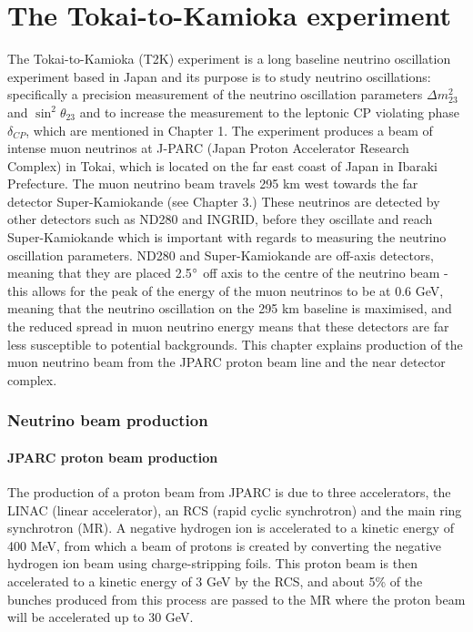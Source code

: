 \chapter{The Tokai-to-Kamioka experiment}
\label{chp:t2kdetector}

The Tokai-to-Kamioka (T2K) experiment is a long baseline neutrino oscillation experiment based in Japan and its purpose is to study neutrino oscillations: specifically a precision measurement of the neutrino oscillation parameters $\Delta m_{23}^{2}$ and $\sin ^{2} \theta_{23}$ and to increase the measurement to the leptonic CP violating phase $\delta_{CP}$, which are mentioned in Chapter 1. The experiment produces a beam of intense muon neutrinos at J-PARC (Japan Proton Accelerator Research Complex) in Tokai, which is located on the far east coast of Japan in Ibaraki Prefecture. The muon neutrino beam travels 295 km west towards the far detector Super-Kamiokande (see Chapter 3.)  These neutrinos are detected by other detectors such as ND280 and INGRID, before they oscillate and reach Super-Kamiokande which is important with regards to measuring the neutrino oscillation parameters. ND280 and Super-Kamiokande are off-axis detectors, meaning that they are placed 2.5$\degree$ off axis to the centre of the neutrino beam - this allows for the peak of the energy of the muon neutrinos to be at 0.6 GeV, meaning that the neutrino oscillation on the 295 km baseline is maximised, and the reduced spread in muon neutrino energy means that these detectors are far less susceptible to potential backgrounds. This chapter explains production of the muon neutrino beam from the JPARC proton beam line and the near detector complex.

\subsection{Neutrino beam production}

\subsubsection{JPARC proton beam production}

The production of a proton beam from JPARC is due to three accelerators, the LINAC (linear accelerator), an RCS (rapid cyclic synchrotron) and the main ring synchrotron (MR). A negative hydrogen ion is accelerated to a kinetic energy of 400 MeV, from which a beam of protons is created by converting the negative hydrogen ion beam using charge-stripping foils. This proton beam is then accelerated to a kinetic energy of 3 GeV by the RCS, and about 5\% of the bunches produced from this process are passed to the MR where the proton beam will be accelerated up to 30 GeV. 

